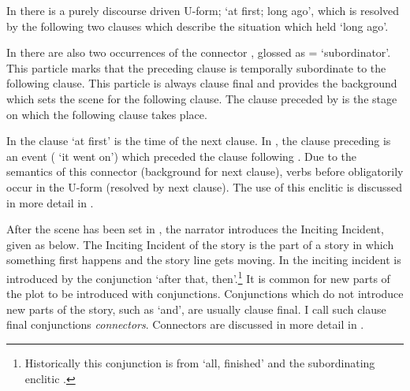 In  there is a purely discourse
driven U-form;  `at first; long ago',
which is resolved by the following two clauses
which describe the situation which held `long ago'.

In  there are also two occurrences of
the connector , glossed as ={\te} `subordinator'.
This particle marks that the preceding clause is temporally
subordinate to the following clause.
This particle is always clause final and provides the background
which sets the scene for the following clause.
The clause preceded by  is the stage
on which the following clause takes place.

In  the clause  `at first'
is the time of the next clause.
In , the clause preceding 
is an event ( `it went on') which preceded the clause following .
Due to the semantics of this connector (background for next clause),
verbs before  obligatorily occur in the U-form (resolved by next clause).
The use of this enclitic is discussed in more detail in .

After the scene has been set in ,
the narrator introduces the Inciting Incident,
given as  below.
The Inciting Incident of the story is the part of a story
in which something first happens and the story line gets moving.
In  the inciting incident is introduced
by the conjunction  `after that, then'.\footnote{
Historically this conjunction is from  `all, finished'
and the subordinating enclitic .}
It is common for new parts of the plot to be introduced with conjunctions.
Conjunctions which do not introduce new parts of the story,
such as  `and', are usually clause final.
I call such clause final conjunctions \emph{connectors}.
Connectors are discussed in more detail in .

\begin{exe}
	\label{ex:130823-2, 0.22-0.29}
	\begin{xlist}
		\label{ex:130823-2, 0.22}
		\label{ex:130823-2, 0.29}
	\end{xlist}
\end{exe}

